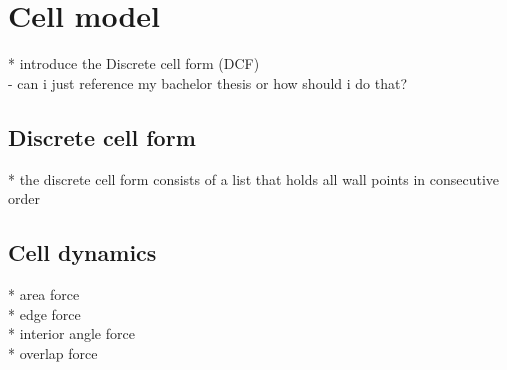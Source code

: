 \section{Cell model} 
* introduce the Discrete cell form (DCF) \\
- can i just reference my bachelor thesis or how should i do that? 

\subsection{Discrete cell form}
* the discrete cell form consists of a list that holds all wall points in consecutive order 

\subsection{Cell dynamics} 
* area force \\
* edge force \\
* interior angle force \\ 
* overlap force \\